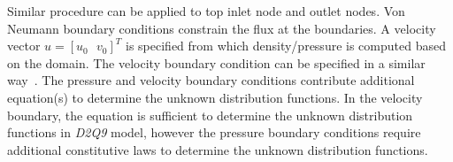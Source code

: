 Similar procedure can be applied to top inlet node and outlet nodes. Von Neumann boundary conditions constrain the flux at the boundaries. A velocity vector $u=\left[ u_0\mbox{ }v_0 \right]^T$ is specified from which density/pressure is computed based on the domain. The velocity boundary condition can be specified in a similar way~\citep{Zou1997}. The pressure and velocity boundary conditions contribute additional equation(s) to determine the unknown distribution functions. In the velocity boundary, the equation is sufficient to determine the unknown distribution functions in \textit{D2Q9} model, however the pressure boundary conditions require additional constitutive laws to determine the unknown distribution functions. 

